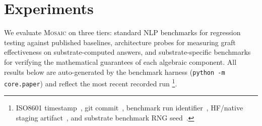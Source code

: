 
\section{Experiments}
\label{sec:experiments}



We evaluate \textsc{Mosaic} on three tiers: standard NLP benchmarks for
regression testing against published baselines, architecture probes for
measuring graft effectiveness on substrate-computed answers, and
substrate-specific benchmarks for verifying the mathematical guarantees of each
algebraic component.  All results below are auto-generated by the benchmark
harness (\texttt{python -m core.paper}) and reflect the most recent recorded run%
\footnote{ISO8601 timestamp~\BenchRunTimestamp{}, git commit~\BenchRunCommit{}, benchmark run identifier~\BenchRunId{},
HF/native staging artifact~\BenchRunNativeArtifact{}, and substrate benchmark RNG seed~\BenchRunSeed{}.}.


